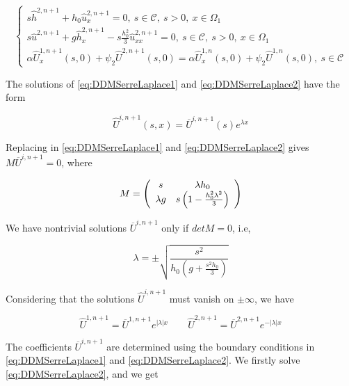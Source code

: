   \begin{equation}
 \label{eq:DDMSerreLaplace2}
 \begin{cases}
 s\hat{h}^{2,n+1} + h_0\hat{u}_x^{2,n+1} = 0, \ s \in \mathcal{C}, \ s > 0, \ x \in \Omega_1 \\
 s\hat{u}^{2,n+1} + g \hat{h}_x^{2,n+1} - s\frac{h_0^2}{3}\hat{u}^{2,n+1}_{xx} = 0, \ s \in \mathcal{C}, \ s > 0, \ x \in \Omega_1  \\
 \alpha \hat{U}_x^{1,n+1}(s,0) + \psi_2\hat{U}^{2,n+1}(s,0) = \alpha \hat{U}_x^{1,n}(s,0) + \psi_2\hat{U}^{1,n}(s,0), \ s \in \mathcal{C}
 \end{cases}
 \end{equation}
 
 \indent The solutions of \eqref{eq:DDMSerreLaplace1} and \eqref{eq:DDMSerreLaplace2} have the form
 
 \begin{equation}
 \label{eq:generalSolution}
 \hat{U}^{i,n+1}(s,x) = \overline{U}^{i,n+1}(s)e^{\lambda x}
 \end{equation}
 
 \indent Replacing in \eqref{eq:DDMSerreLaplace1} and \eqref{eq:DDMSerreLaplace2} gives $M\overline{U}^{i,n+1} = 0$, where
 
 \begin{equation}
 M = \left( \begin{array}{c c}
 						s & \lambda h_0 \\
 						\lambda g & s \left(1- \frac{h_0^2\lambda^2}{3} \right) 
 				\end{array} \right)
 \end{equation}
 
 \indent We have nontrivial solutions $\overline{U}^{i,n+1}$ only if $detM = 0$, i.e,
 
 \begin{equation}
 \label{eq:lambda} 
 	\lambda = \pm \sqrt{\frac{s^2}{h_0\left(g+\frac{s^2h_0}{3}\right)}}
 \end{equation}
 
 \indent Considering that the solutions $\hat{U}^{i,n+1}$ must vanish on $\pm \infty$, we have
 
 \begin{equation}
 \hat{U}^{1,n+1} = \overline{U}^{1,n+1}e^{|\lambda|x} \qquad \hat{U}^{2,n+1} = \overline{U}^{2,n+1}e^{-|\lambda|x}
 \end{equation}
 
 \indent The coefficients $\overline{U}^{i,n+1}$ are determined using the boundary conditions in \eqref{eq:DDMSerreLaplace1} and \eqref{eq:DDMSerreLaplace2}. We firstly solve \eqref{eq:DDMSerreLaplace2}, and we get
 
